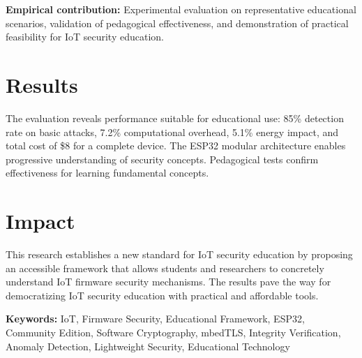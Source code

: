 \textbf{Empirical contribution:} Experimental evaluation on representative educational scenarios, validation of pedagogical effectiveness, and demonstration of practical feasibility for IoT security education.

\section*{Results}

The evaluation reveals performance suitable for educational use: 85\% detection rate on basic attacks, 7.2\% computational overhead, 5.1\% energy impact, and total cost of \$8 for a complete device. The ESP32 modular architecture enables progressive understanding of security concepts. Pedagogical tests confirm effectiveness for learning fundamental concepts.

\section*{Impact}

This research establishes a new standard for IoT security education by proposing an accessible framework that allows students and researchers to concretely understand IoT firmware security mechanisms. The results pave the way for democratizing IoT security education with practical and affordable tools.

\textbf{Keywords:} IoT, Firmware Security, Educational Framework, ESP32, Community Edition, Software Cryptography, mbedTLS, Integrity Verification, Anomaly Detection, Lightweight Security, Educational Technology
